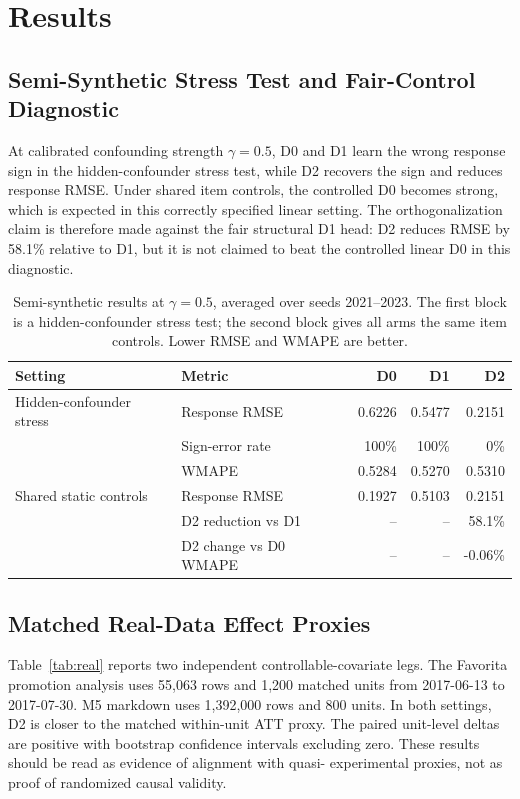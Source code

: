 \documentclass[11pt]{article}
\begin{document}
\section{Results}

\subsection{Semi-Synthetic Stress Test and Fair-Control Diagnostic}

At calibrated confounding strength $\gamma=0.5$, D0 and D1 learn the wrong
response sign in the hidden-confounder stress test, while D2 recovers the sign
and reduces response RMSE. Under shared item controls, the controlled D0 becomes
strong, which is expected in this correctly specified linear setting. The
orthogonalization claim is therefore made against the fair structural D1 head:
D2 reduces RMSE by 58.1\% relative to D1, but it is not claimed to beat the
controlled linear D0 in this diagnostic.

\begin{table}[t]
\centering
\caption{Semi-synthetic results at $\gamma=0.5$, averaged over seeds 2021--2023.
The first block is a hidden-confounder stress test; the second block gives all
arms the same item controls. Lower RMSE and WMAPE are better.}
\label{tab:stress}
\begin{tabular}{llrrr}
\toprule
Setting & Metric & D0 & D1 & D2 \\
\midrule
Hidden-confounder stress & Response RMSE & 0.6226 & 0.5477 & 0.2151 \\
                         & Sign-error rate & 100\% & 100\% & 0\% \\
                         & WMAPE & 0.5284 & 0.5270 & 0.5310 \\
\midrule
Shared static controls   & Response RMSE & 0.1927 & 0.5103 & 0.2151 \\
                         & D2 reduction vs D1 & -- & -- & 58.1\% \\
                         & D2 change vs D0 WMAPE & -- & -- & -0.06\% \\
\bottomrule
\end{tabular}
\end{table}

\subsection{Matched Real-Data Effect Proxies}

Table~\ref{tab:real} reports two independent controllable-covariate legs. The
Favorita promotion analysis uses 55,063 rows and 1,200 matched units from
2017-06-13 to 2017-07-30. M5 markdown uses 1,392,000 rows and 800 units. In
both settings, D2 is closer to the matched within-unit ATT proxy. The paired
unit-level deltas are positive with bootstrap confidence intervals excluding
zero. These results should be read as evidence of alignment with quasi-
experimental proxies, not as proof of randomized causal validity.
\end{document}
